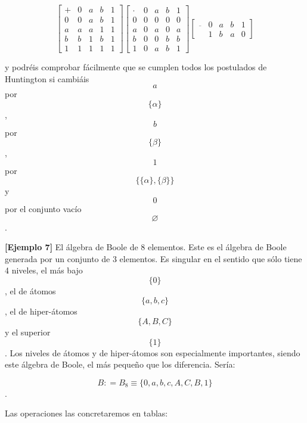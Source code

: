\documentclass[
]{article}
\begin{document}
\begin{enumerate}
  \[\begin{bmatrix}
   + & 0 & a & b & 1 \\
  0 & 0 & a & b & 1 \\
  a & a & a & 1 & 1 \\
  b & b & 1 & b & 1 \\
  1 & 1 & 1 & 1 & 1
  \end{bmatrix}\begin{bmatrix}
   \cdot & 0 & a & b & 1 \\
  0 & 0 & 0 & 0 & 0 \\
  a & 0 & a & 0 & a \\
  b & 0 & 0 & b & b \\
  1 & 0 & a & b & 1
  \end{bmatrix}\begin{bmatrix}
  \overline{} & 0 & a & b & 1 \\
   & 1 & b & a & 0
  \end{bmatrix}\]

  y podréis comprobar fácilmente que se cumplen todos los postulados de
  Huntington si cam\-biáis \[a\] por \[\{\alpha\}\], \[b\] por
  \[\{\beta\}\], \[1\] por \[\{{{\{\alpha\}},{\{\beta\}}}\}\] y \[0\]
  por el conjunto vacío \[\varnothing\].

  \textbf{{[}Ejemplo 7{]}} El álgebra de Boole de 8 elementos. Este es
  el álgebra de Boole generada por un conjunto de 3 elementos. Es
  singular en el sentido que sólo tiene 4 niveles, el más bajo
  \[\{ 0\}\], el de átomos \[\{{a,b,c}\}\], el de hiper-átomos
  \[\{{A,B,C}\}\] y el superior \[\{ 1\}\]. Los niveles de átomos y de
  hiper-átomos son especialmente importantes, siendo este álge\-bra de
  Boole, el más pequeño que los diferencia. Sería:

  \[B{{: = B_{8}} \equiv {\{{0,a,b,c,A,C,B,1}\}}}\].

  Las operaciones las concretaremos en tablas:


\end{enumerate}
\end{document}
